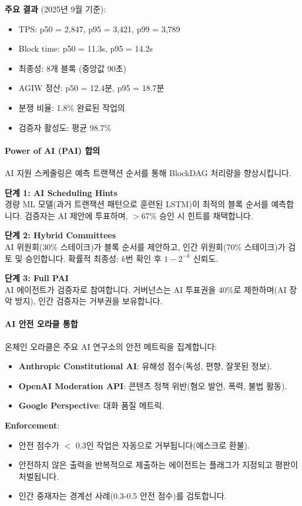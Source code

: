 \documentclass[11pt]{article}
\begin{document}
\textbf{주요 결과} (2025년 9월 기준):
\begin{itemize}[noitemsep]
  \item TPS: p50 = 2,847, p95 = 3,421, p99 = 3,789
  \item Block time: p50 = 11.3s, p95 = 14.2s
  \item 최종성: 8개 블록 (중앙값 90초)
  \item AGIW 정산: p50 = 12.4분, p95 = 18.7분
  \item 분쟁 비율: 1.8\% 완료된 작업의
  \item 검증자 활성도: 평균 98.7\%
\end{itemize}

\paragraph{Power of AI (PAI) 합의}
AI 지원 스케줄링은 예측 트랜잭션 순서를 통해 BlockDAG 처리량을 향상시킵니다.

\textbf{단계 1: AI Scheduling Hints}\\
경량 ML 모델(과거 트랜잭션 패턴으로 훈련된 LSTM)이 최적의 블록 순서를 예측합니다. 검증자는 AI 제안에 투표하며, $>$67\% 승인 시 힌트를 채택합니다.

\textbf{단계 2: Hybrid Committees}\\
AI 위원회(30\% 스테이크)가 블록 순서를 제안하고, 인간 위원회(70\% 스테이크)가 검토 및 승인합니다. 확률적 최종성: $k$번 확인 후 $1 - 2^{-k}$ 신뢰도.

\textbf{단계 3: Full PAI}\\
AI 에이전트가 검증자로 참여합니다. 거버넌스는 AI 투표권을 40\%로 제한하며(AI 장악 방지), 인간 검증자는 거부권을 보유합니다.

\paragraph{AI 안전 오라클 통합}
온체인 오라클은 주요 AI 연구소의 안전 메트릭을 집계합니다:
\begin{itemize}[noitemsep]
  \item \textbf{Anthropic Constitutional AI}: 유해성 점수(독성, 편향, 잘못된 정보).
  \item \textbf{OpenAI Moderation API}: 콘텐츠 정책 위반(혐오 발언, 폭력, 불법 활동).
  \item \textbf{Google Perspective}: 대화 품질 메트릭.
\end{itemize}

\textbf{Enforcement}:
\begin{itemize}[noitemsep]
  \item 안전 점수가 $<$ 0.3인 작업은 자동으로 거부됩니다(에스크로 환불).
  \item 안전하지 않은 출력을 반복적으로 제출하는 에이전트는 플래그가 지정되고 평판이 처벌됩니다.
  \item 인간 중재자는 경계선 사례(0.3-0.5 안전 점수)를 검토합니다.
\end{itemize}
\end{document}
